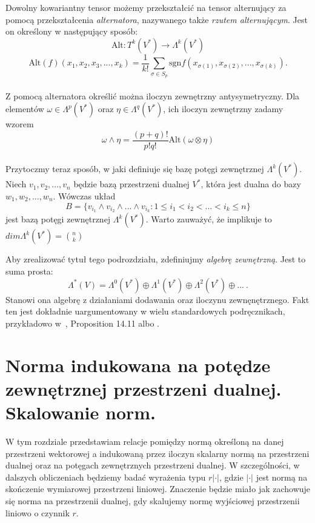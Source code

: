 \documentclass[licencjacka]{pracamgr}
\theoremstyle{definition}
\theoremstyle{definition}
\theoremstyle{plain}
\theoremstyle{plain}
\theoremstyle{plain}
\theoremstyle{plain}
\begin{document}
Dowolny kowariantny tensor możemy
przekształcić na tensor alternujący za pomocą przekształcenia
\emph{alternatora}, nazywanego także \emph{rzutem alternującym}.
Jest on określony w następujący sposób:
\[
\text{Alt}:T^k (V^\ast) \rightarrow  \Lambda^k (V^\ast)
\]
\[
\text{Alt}(f)(x_1, x_2, x_3, ..., x_k) = \frac{1}{k!}
  \sum_{\sigma \in S_p}
     \text{sgn} f(x_{\sigma(1)}, x_{\sigma(2)}, ..., x_{\sigma(k)}).
\] \\

Z pomocą alternatora określić można iloczyn zewnętrzny antysymetryczny. 
Dla elementów $\omega \in \Lambda^p (V^\ast)$ oraz 
$\eta \in \Lambda^q (V^\ast)$, ich iloczyn zewnętrzny zadamy wzorem
\[
  \omega \wedge \eta = \frac{(p+q)!}{p!q!} \text{Alt} (\omega \otimes \eta)
\] \\

Przytoczmy teraz sposób, w jaki definiuje się bazę potęgi zewnętrznej
$\Lambda^k(V^\ast)$. Niech $v_1, v_2, ... , v_n$ będzie bazą przestrzeni dualnej
$V^\ast$, która jest dualna do bazy $w_1, w_2, ..., w_n$.
Wówczas układ
\[
  B = \{ v_{i_1} \wedge v_{i_2} \wedge ... \wedge v_{i_k} : 1 \leq i_1 < i_2 < ... <i_k \leq n \}
\]
jest bazą potęgi zewnętrznej $\Lambda^k(V^\ast)$. Warto zauważyć, że implikuje
 to $dim \Lambda^k ( V^\ast)= \binom{n}{k}$

Aby zrealizować tytuł tego podrozdziału, zdefiniujmy
\emph{algebrę zewnętrzną}. Jest to suma prosta:
\[
\Lambda^\ast (V) = 
\Lambda^0(V^\ast) \oplus
\Lambda^1(V^\ast) \oplus
\Lambda^2(V^\ast) \oplus
...~.
\] Stanowi ona algebrę z działaniami dodawania oraz iloczynu zewnęnętrznego.
Fakt ten jest dokładnie uargumentowany w wielu standardowych podręcznikach,
przykładowo w~\cite{lee}, Proposition 14.11 albo \cite{kostrikin}.\\


\section{Norma indukowana na potędze zewnętrznej przestrzeni dualnej.
Skalowanie norm.}

W tym rozdziale przedstawiam relacje pomiędzy normą określoną na danej
przestrzeni wektorowej a indukowaną przez iloczyn skalarny normą na przestrzeni
dualnej oraz na potęgach zewnętrznych przestrzeni dualnej.  W szczególności, w
dalszych obliczeniach będziemy badać wyrażenia typu $r |\cdot|$, gdzie
$|\cdot|$ jest normą na skończenie wymiarowej przestrzeni liniowej.  Znaczenie
będzie miało jak zachowuje się norma na przestrzenii dualnej, gdy skalujemy
normę wyjściowej przestrzenii liniowo o czynnik $r$. \\
\end{document}
